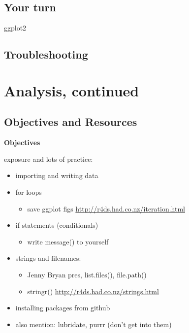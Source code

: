 \documentclass[]{book}
\providecommand{\tightlist}{%
  \setlength{\itemsep}{0pt}\setlength{\parskip}{0pt}}
\theoremstyle{definition}
\theoremstyle{definition}
\theoremstyle{definition}
\theoremstyle{remark}
\begin{document}
\section{Your turn}\label{your-turn-10}

ggplot2

\section{Troubleshooting}\label{troubleshooting-3}

\chapter{Analysis, continued}\label{analysis}

\section{Objectives and Resources}\label{objectives-and-resources}

\textbf{Objectives}

exposure and lots of practice:

\begin{itemize}
\tightlist
\item
  importing and writing data
\item
  for loops

  \begin{itemize}
  \tightlist
  \item
    save ggplot figs \url{http://r4ds.had.co.nz/iteration.html}
  \end{itemize}
\item
  if statements (conditionals)

  \begin{itemize}
  \tightlist
  \item
    write message() to yourself
  \end{itemize}
\item
  strings and filenames:

  \begin{itemize}
  \tightlist
  \item
    Jenny Bryan pres, list.files(), file.path()
  \item
    stringr() \url{http://r4ds.had.co.nz/strings.html}
  \end{itemize}
\item
  installing packages from github
\item
  also mention: lubridate, purrr (don't get into them)
\end{itemize}
\end{document}
